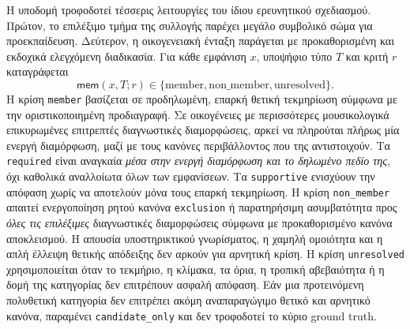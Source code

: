 \documentclass[11pt,a4paper]{article}
\begin{document}
Η υποδομή τροφοδοτεί τέσσερις λειτουργίες του ίδιου ερευνητικού σχεδιασμού. Πρώτον, το επιλέξιμο τμήμα της συλλογής παρέχει μεγάλο συμβολικό σώμα για προεκπαίδευση. Δεύτερον, η οικογενειακή ένταξη παράγεται με προκαθορισμένη και εκδοχικά ελεγχόμενη διαδικασία. Για κάθε εμφάνιση $x$, υποψήφιο τύπο $T$ και κριτή $r$ καταγράφεται
\[
\mathsf{mem}(x,T;r)\in\{\mathrm{member},\mathrm{non\_member},\mathrm{unresolved}\}.
\]
Η κρίση \texttt{member} βασίζεται σε προδηλωμένη, επαρκή θετική τεκμηρίωση σύμφωνα με την οριστικοποιημένη προδιαγραφή. Σε οικογένειες με περισσότερες μουσικολογικά επικυρωμένες επιτρεπτές διαγνωστικές διαμορφώσεις, αρκεί να πληρούται πλήρως μία ενεργή διαμόρφωση, μαζί με τους κανόνες περιβάλλοντος που της αντιστοιχούν. Τα \texttt{required} είναι αναγκαία \emph{μέσα στην ενεργή διαμόρφωση και το δηλωμένο πεδίο της}, όχι καθολικά αναλλοίωτα όλων των εμφανίσεων. Τα \texttt{supportive} ενισχύουν την απόφαση χωρίς να αποτελούν μόνα τους επαρκή τεκμηρίωση. Η κρίση \texttt{non\_member} απαιτεί ενεργοποίηση ρητού κανόνα \texttt{exclusion} ή παρατηρήσιμη ασυμβατότητα προς \emph{όλες τις επιλέξιμες} διαγνωστικές διαμορφώσεις σύμφωνα με προκαθορισμένο κανόνα αποκλεισμού. Η απουσία υποστηρικτικού γνωρίσματος, η χαμηλή ομοιότητα και η απλή έλλειψη θετικής απόδειξης δεν αρκούν για αρνητική κρίση. Η κρίση \texttt{unresolved} χρησιμοποιείται όταν το τεκμήριο, η κλίμακα, τα όρια, η τροπική αβεβαιότητα ή η δομή της κατηγορίας δεν επιτρέπουν ασφαλή απόφαση. Εάν μια προτεινόμενη πολυθετική κατηγορία δεν επιτρέπει ακόμη αναπαραγώγιμο θετικό και αρνητικό κανόνα, παραμένει \texttt{candidate\_only} και δεν τροφοδοτεί το κύριο ground truth.
\end{document}
